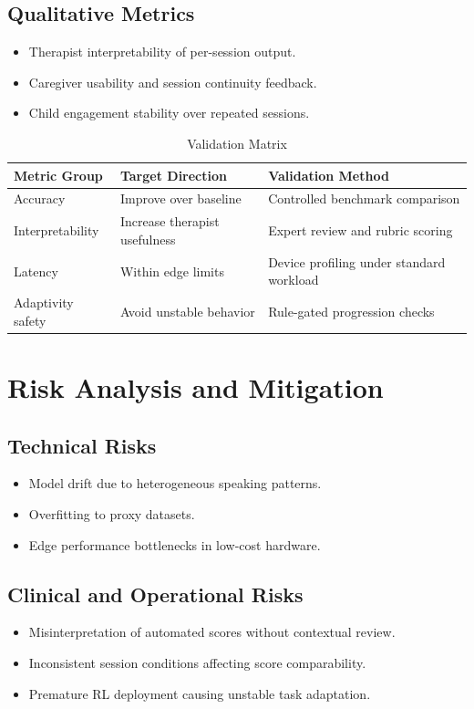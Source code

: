 \documentclass[12pt,a4paper]{article}
\begin{document}
\subsection{Qualitative Metrics}
\begin{itemize}[noitemsep,topsep=2pt]
\item Therapist interpretability of per-session output.
\item Caregiver usability and session continuity feedback.
\item Child engagement stability over repeated sessions.
\end{itemize}

\begin{table}[H]
\centering
\caption{Validation Matrix}
\renewcommand{\arraystretch}{1.25}
\begin{tabularx}{\textwidth}{|p{3.5cm}|L|L|}
\hline
\textbf{Metric Group} & \textbf{Target Direction} & \textbf{Validation Method} \\
\hline
Accuracy & Improve over baseline & Controlled benchmark comparison \\
\hline
Interpretability & Increase therapist usefulness & Expert review and rubric scoring \\
\hline
Latency & Within edge limits & Device profiling under standard workload \\
\hline
Adaptivity safety & Avoid unstable behavior & Rule-gated progression checks \\
\hline
\end{tabularx}
\end{table}

\section{Risk Analysis and Mitigation}
\subsection{Technical Risks}
\begin{itemize}[noitemsep,topsep=2pt]
\item Model drift due to heterogeneous speaking patterns.
\item Overfitting to proxy datasets.
\item Edge performance bottlenecks in low-cost hardware.
\end{itemize}

\subsection{Clinical and Operational Risks}
\begin{itemize}[noitemsep,topsep=2pt]
\item Misinterpretation of automated scores without contextual review.
\item Inconsistent session conditions affecting score comparability.
\item Premature RL deployment causing unstable task adaptation.
\end{itemize}
\end{document}
